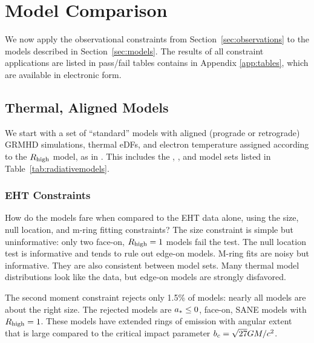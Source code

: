\section{Model Comparison}\label{sec:comparisons}

We now apply the observational constraints from Section~\ref{sec:observations} to the models described in Section~\ref{sec:models}.  The results of all constraint applications are listed in pass/fail tables contains in Appendix \ref{app:tables}, which are available in electronic form.   

\subsection{Thermal, Aligned Models}\label{subsec:thermal}

We start with a set of ``standard'' models with aligned (prograde or retrograde) GRMHD simulations, thermal eDFs, and electron temperature assigned according to the $R_\mathrm{high}$ model, as in .  This includes the \kharma, \bhac, and \hamr model sets listed in Table~\ref{tab:radiativemodels}.

\subsubsection{EHT Constraints}

How do the models fare when compared to the EHT data alone, using the size, null location, and m-ring fitting constraints?  The size constraint is simple but uninformative: only two face-on, $R_\mathrm{high} = 1$ models fail the test.  The null location test is informative and tends to rule out edge-on models. M-ring fits are noisy but informative.  They are also consistent between model sets.  Many thermal model distributions look like the data, but edge-on models are strongly disfavored.



The second moment constraint rejects only 1.5\% of models: nearly all models are about the right size.  The rejected models are $a_* \le 0$, face-on, SANE models with $R_\mathrm{high} = 1$. These models have extended rings of emission with angular extent that is large compared to the critical impact parameter $b_c = \sqrt{27} GM/c^2$.

